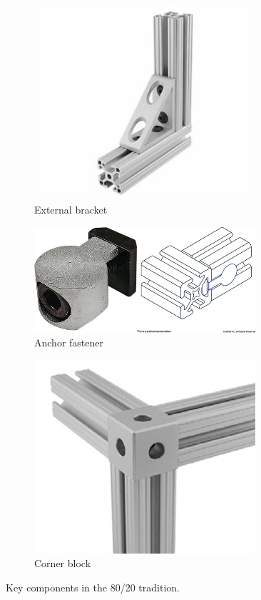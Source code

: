 \begin{figure}[H]
\begin{subfigure}[b]{.32\linewidth}
		\includegraphics[width=0.9\textwidth]{imgs/tradition_8020_ext_bracket.jpeg}
		\caption{External bracket}
	\end{subfigure}
	
	\begin{subfigure}[b]{.55\linewidth}
		\includegraphics[width=0.9\textwidth]{imgs/tradition_8020_anchor.jpeg}
		\caption{Anchor fastener}
	\end{subfigure}\begin{subfigure}[b]{.4\linewidth}
		\includegraphics[width=0.9\textwidth]{imgs/tradition_8020_corner.png}
		\caption{Corner block}
	\end{subfigure}
	\caption{Key components in the 80/20 tradition.}
	\end{figure}
	
